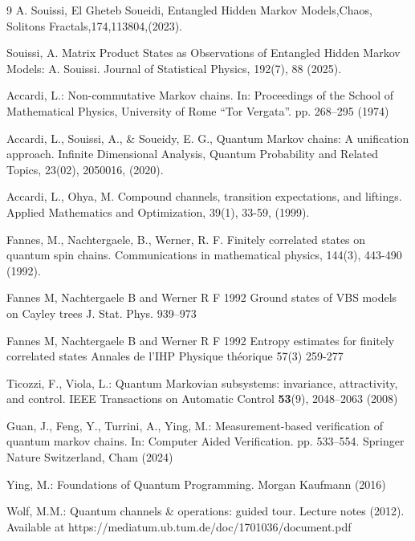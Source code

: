 \documentclass[12pt,a4paper]{article}
\begin{document}
\begin{thebibliography}{9}
A. Souissi, El Gheteb Soueidi, Entangled Hidden Markov Models,Chaos, Solitons  Fractals,174,113804,(2023).


  Souissi, A. Matrix Product States as Observations of Entangled Hidden Markov Models: A. Souissi. Journal of Statistical Physics, 192(7), 88  (2025).

Accardi, L.: Non-commutative Markov chains. In: Proceedings of the School of Mathematical Physics, University of Rome ``Tor Vergata''. pp. 268--295 (1974)


 Accardi, L., Souissi, A., \& Soueidy, E. G., Quantum Markov chains: A unification approach. Infinite Dimensional Analysis, Quantum Probability and Related Topics, 23(02), 2050016,  (2020).

Accardi, L.,   Ohya, M. Compound channels, transition expectations, and liftings. Applied Mathematics and Optimization, 39(1), 33-59,  (1999).





 Fannes, M., Nachtergaele, B.,   Werner, R. F. Finitely correlated states on quantum spin chains. Communications in mathematical physics, 144(3), 443-490  (1992).


 Fannes M, Nachtergaele B and Werner R F 1992 Ground states of VBS models on Cayley trees J. Stat. Phys. 939–973

 Fannes M, Nachtergaele B and Werner R F 1992 Entropy estimates for finitely correlated states Annales de l'IHP Physique théorique 57(3) 259-277



Ticozzi, F., Viola, L.: Quantum Markovian subsystems: invariance, attractivity, and control. IEEE Transactions on Automatic Control \textbf{53}(9), 2048--2063 (2008)



Guan, J., Feng, Y., Turrini, A., Ying, M.: Measurement-based verification of quantum markov chains. In: Computer Aided Verification. pp. 533--554. Springer Nature Switzerland, Cham (2024)

Ying, M.: Foundations of Quantum Programming. Morgan Kaufmann (2016)

Wolf, M.M.: Quantum channels \& operations: guided tour. Lecture notes (2012). Available at https://mediatum.ub.tum.de/doc/1701036/document.pdf


\end{thebibliography}
\end{document}
